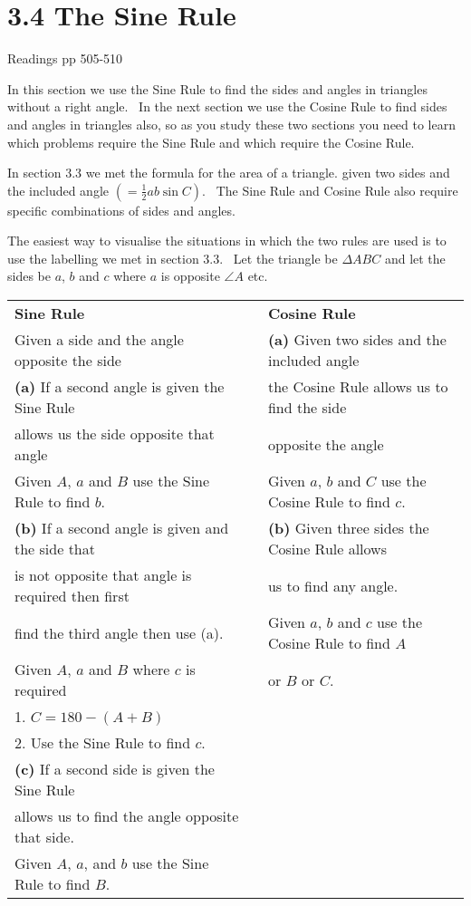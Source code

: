\section{3.4 The Sine Rule}
Readings pp 505-510 

In this section we use the Sine Rule to find the sides and angles in triangles without a right angle.
\ In the next section we use the Cosine Rule to find sides and angles in triangles also, so as you study these
two sections you need to learn which problems require the Sine Rule and which require the Cosine Rule. 

In section 3.3 we met the formula
for the area of a triangle. given two sides and the included angle $\left ( =\frac{1}{2} a b \sin  C\right )$. \ The Sine Rule and
Cosine Rule also require specific combinations of sides and angles. 

The easiest way to visualise the situations in which the two rules
are used is to use the labelling we met in section $3.3$. \ Let the triangle be $ \Delta A B C$ and let the sides be $a$, $b$ and $c$ where $a$ is opposite $\angle A$ etc. 

   
\setlength\fboxrule{0in}\setlength\fboxsep{0.2in}



\begin{tabular}[c]{lll}\textbf{Sine Rule}  &  & \textbf{Cosine
Rule}  \\
 Given a side and the angle opposite the side  &  & \textbf{(a)}
Given two sides and the included angle  \\
 \textbf{(a)} If a second angle is
given the Sine Rule  &  & the Cosine Rule allows us to find the
side  \\
allows us the side opposite that angle  &  & opposite
the angle  \\
Given $A$, $a$ and $B$ use the Sine Rule to find $b\text{.}$  &  & Given $a$, $b$ and $C$ use the Cosine Rule to find $c\text{.}$  \\
 \textbf{(b)} If a second
angle is given and the side that  &  & \textbf{(b)} Given three
sides the Cosine Rule allows  \\
is not opposite that angle is required then first  &  & us
to find any angle.  \\
find the third angle then use (a).  &  & Given
$a$, $b$ and $c$ use the Cosine Rule to find $A$  \\
Given $A$, $a$ and $B$ where $c$ is required  &  & or $B$ or $C$.  \\
 1. $C =180 -(A +B)$  &  &  \\
2.
Use the Sine Rule to find $c$.  &  &  \\
\textbf{(c)} If a second side is given the Sine Rule  &  &  \\
allows
us to find the angle opposite that side.  &  &  \\
Given
$A$, $a$, and $b$ use the Sine Rule to find $B$.  &  &  \\
\end{tabular}

